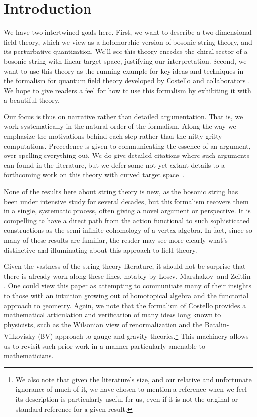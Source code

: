 \section{Introduction}

We have two intertwined goals here.
First, we want to describe a two-dimensional field theory,
which we view as a holomorphic version of bosonic string theory,
and its perturbative quantization.
We'll see this theory encodes the chiral sector of a bosonic string with linear target space,
justifying our interpretation.
Second, we want to use this theory as the running example for key ideas and techniques in the formalism for quantum field theory developed by Costello and collaborators \cite{CosBook, CG1,CG2, others}.
We hope to give readers a feel for how to use this formalism by exhibiting it with a beautiful theory.

Our focus is thus on narrative rather than detailed argumentation.
That is, we work systematically in the natural order of the formalism. 
Along the way we emphasize the motivations behind each step rather than the nitty-gritty computations. 
Precedence is given to communicating the essence of an argument, over spelling everything out.
We do give detailed citations where such arguments can found in the literature,
but we defer some not-yet-extant details to a forthcoming work on this theory with curved target space~\cite{GWcurved}.

None of the results here about string theory is new, 
as the bosonic string has been under intensive study for several decades,
but this formalism recovers them in a single, systematic process,
often giving a novel argument or perspective.
It is compelling to have a direct path from the action functional to such sophisticated constructions as the semi-infinite cohomology of a vertex algebra.
In fact, since so many of these results are familiar,
the reader may see more clearly what's distinctive and illuminating about this approach to field theory.

Given the vastness of the string theory literature,
it should not be surprise that there is already work along these lines,
notably by Losev, Marshakov, and Zeitlin \cite{LMZ}.
One could view this paper as attempting to communicate many of their insights to those with an intuition growing out of homotopical algebra and the functorial approach to geometry.
Again, we note that the formalism of Costello provides a mathematical articulation and verification of many ideas long known to physicists, such as the Wilsonian view of renormalization and the Batalin-Vilkovisky (BV) approach to gauge and gravity theories.\footnote{We also note that given the literature's size,
and our relative and unfortunate ignorance of much of it,
we have chosen to mention a reference when we feel its description is particularly useful for us, 
even if it is not the original or standard reference for a given result.}
This machinery allows us to revisit such prior work in a manner particularly amenable to mathematicians.

